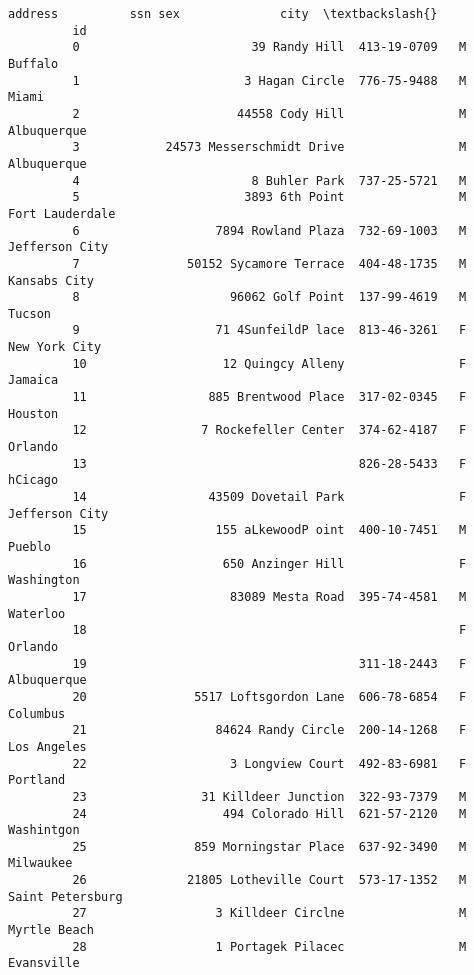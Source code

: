 \documentclass[11pt]{article}
\begin{document}
\begin{Verbatim}[commandchars=\\\{\}]
                                        address          ssn sex              city  \textbackslash{}
         id                                                                          
         0                        39 Randy Hill  413-19-0709   M           Buffalo   
         1                       3 Hagan Circle  776-75-9488   M             Miami   
         2                      44558 Cody Hill                M       Albuquerque   
         3            24573 Messerschmidt Drive                M       Albuquerque   
         4                        8 Buhler Park  737-25-5721   M                     
         5                       3893 6th Point                M   Fort Lauderdale   
         6                   7894 Rowland Plaza  732-69-1003   M    Jefferson City   
         7               50152 Sycamore Terrace  404-48-1735   M      Kansabs City   
         8                     96062 Golf Point  137-99-4619   M            Tucson   
         9                   71 4SunfeildP lace  813-46-3261   F     New York City   
         10                   12 Quingcy Alleny                F           Jamaica   
         11                 885 Brentwood Place  317-02-0345   F           Houston   
         12                7 Rockefeller Center  374-62-4187   F           Orlando   
         13                                      826-28-5433   F           hCicago   
         14                 43509 Dovetail Park                F    Jefferson City   
         15                  155 aLkewoodP oint  400-10-7451   M            Pueblo   
         16                   650 Anzinger Hill                F        Washington   
         17                    83089 Mesta Road  395-74-4581   M          Waterloo   
         18                                                    F           Orlando   
         19                                      311-18-2443   F       Albuquerque   
         20               5517 Loftsgordon Lane  606-78-6854   F          Columbus   
         21                  84624 Randy Circle  200-14-1268   F       Los Angeles   
         22                    3 Longview Court  492-83-6981   F          Portland   
         23                31 Killdeer Junction  322-93-7379   M                     
         24                   494 Colorado Hill  621-57-2120   M        Washintgon   
         25               859 Morningstar Place  637-92-3490   M         Milwaukee   
         26              21805 Lotheville Court  573-17-1352   M  Saint Petersburg   
         27                  3 Killdeer Circlne                M      Myrtle Beach   
         28                  1 Portagek Pilacec                M        Evansville   

\end{Verbatim}
\end{document}
